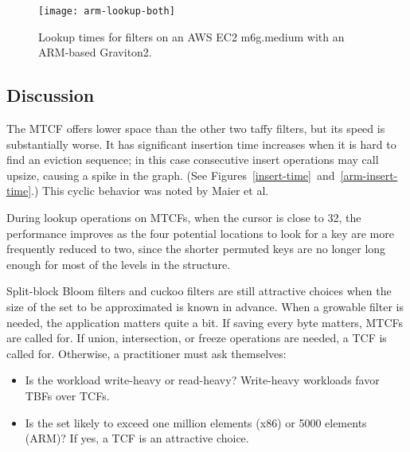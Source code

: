 \documentclass[sigconf]{acmart}
\newcommand{\etal}{et al.}
\begin{document}
\begin{figure}
  \texttt{[image: arm-lookup-both]}
  \caption{
    \label{arm-lookup-both}
    Lookup times for filters on an AWS EC2 m6g.medium with an ARM-based Graviton2.
  }
\end{figure}


\subsection{Discussion}

The MTCF offers lower space than the other two taffy filters, but its speed is substantially worse.
It has significant insertion time increases when it is hard to find an eviction sequence; in this case consecutive insert operations may call upsize, causing a spike in the graph. (See Figures~\ref{insert-time}~and~\ref{arm-insert-time}.)
This cyclic behavior was noted by Maier \etal~\cite{dysect}

During lookup operations on MTCFs, when the cursor is close to 32, the performance improves as the four potential locations to look for a key are more frequently reduced to two, since the shorter permuted keys are no longer long enough for most of the levels in the structure.

Split-block Bloom filters and cuckoo filters are still attractive choices when the size of the set to be approximated is known in advance.
When a growable filter is needed, the application matters quite a bit.
If saving every byte matters, MTCFs are called for.
If union, intersection, or freeze operations are needed, a TCF is called for.
Otherwise, a practitioner must ask themselves:

\begin{itemize}
\item Is the workload write-heavy or read-heavy?
  Write-heavy workloads favor TBFs over TCFs.
\item Is the set likely to exceed one million elements (x86) or 5000 elements (ARM)?
  If yes, a TCF is an attractive choice.
\end{itemize}
\end{document}
